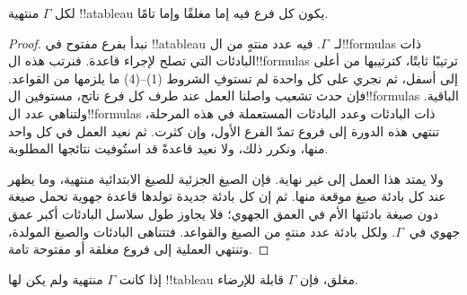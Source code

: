 \documentclass[../../../include/open-logic-section]{subfiles}
\begin{document}
\begin{prop}
  لكل $\Gamma$ منتهية !!a{tableau} يكون كل فرع فيه إما مغلقًا وإما تامًا.
\end{prop}

\begin{proof}
  نبدأ بفرع مفتوح في !!a{tableau} لـ~$\Gamma$.
  فيه عدد منتهٍ من ال!!{formula}s ذات البادئات التي تصلح لإجراء
  قاعدة. فنرتب هذه ال!!{formula}s ترتيبًا ثابتًا، كترتيبها من أعلى
  إلى أسفل، ثم نجري على كل واحدة لم تستوفِ الشروط (1)--(4) ما
  يلزمها من القواعد. فإن حدث تشعيب واصلنا العمل عند طرف كل فرع
  ناتج، مستوفين ال!!{formula}s الباقية. ولتناهي عدد ال!!{formula}s
  ذات البادئات وعدد البادئات المستعملة في هذه المرحلة، تنتهي هذه
  الدورة إلى فروع تمدّ الفرع الأول، وإن كثرت. ثم نعيد العمل في كل
  واحد منها، ونكرر ذلك، ولا نعيد قاعدةً قد استُوفيت نتائجها المطلوبة.

  ولا يمتد هذا العمل إلى غير نهاية. فإن الصيغ الجزئية للصيغ الابتدائية
  منتهية، وما يظهر عند كل بادئة صيغ موقعة منها. ثم إن كل بادئة جديدة
  تولدها قاعدة جهوية تحمل صيغة دون صيغة بادئتها الأم في العمق الجهوي؛
  فلا يجاوز طول سلاسل البادئات أكبر عمق جهوي في~$\Gamma$. ولكل بادئة
  عدد منتهٍ من الصيغ والقواعد. فتتناهى البادئات والصيغ المولدة، وتنتهي
  العملية إلى فروع مغلقة أو مفتوحة تامة.
\end{proof}

\begin{thm}[التمام]
  إذا كانت $\Gamma$ منتهية ولم يكن لها !!{tableau} مغلق، فإن $\Gamma$
  قابلة للإرضاء.
\end{thm}
\end{document}
